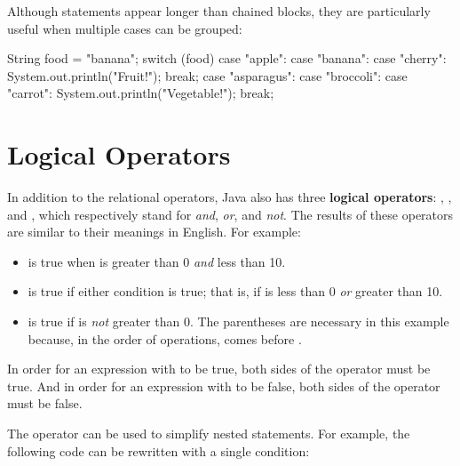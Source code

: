 Although  statements appear longer than chained  blocks, they are particularly useful when multiple cases can be grouped:

\begin{code}
String food = "banana";
switch (food) {
    case "apple":
    case "banana":
    case "cherry":
        System.out.println("Fruit!");
        break;
    case "asparagus":
    case "broccoli":
    case "carrot":
        System.out.println("Vegetable!");
        break;
}
\end{code}



\section{Logical Operators}


In addition to the relational operators, Java also has three {\bf logical operators}: \java{&&}, \java{||}, and \java{!}, which respectively stand for {\em and}, {\em or}, and {\em not}.
The results of these operators are similar to their meanings in English.
For example:

\begin{itemize}

\item {} is true when  is greater than 0 {\em and} less than 10.

\item {} is true if either condition is true; that is, if  is less than 0 {\em or} greater than 10.

\item {} is true if  is {\em not} greater than 0.
The parentheses are necessary in this example because, in the order of operations, \java{!} comes before \java{>}.

\end{itemize}

In order for an expression with \java{&&} to be true, both sides of the \java{&&} operator must be true.
And in order for an expression with \java{||} to be false, both sides of the \java{||} operator must be false.

The \java{&&} operator can be used to simplify nested  statements.
For example, the following code can be rewritten with a single condition:

